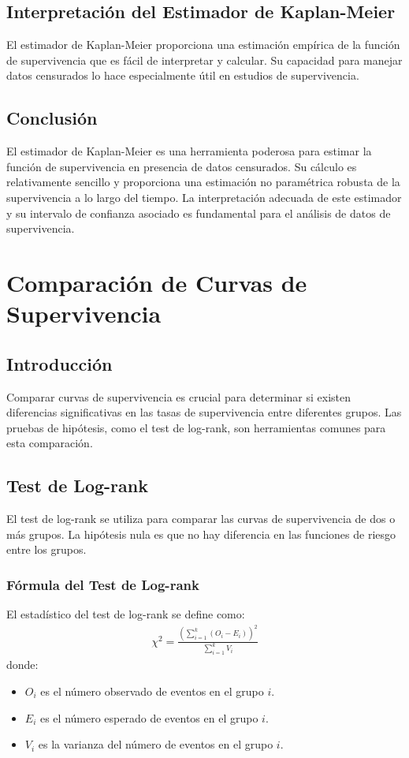 \documentclass[a4paper]{report} %
\begin{document}
\section{Interpretaci\'on del Estimador de Kaplan-Meier}
El estimador de Kaplan-Meier proporciona una estimaci\'on emp\'irica de la funci\'on de supervivencia que es f\'acil de interpretar y calcular. Su capacidad para manejar datos censurados lo hace especialmente \'util en estudios de supervivencia.

\section{Conclusi\'on}
El estimador de Kaplan-Meier es una herramienta poderosa para estimar la funci\'on de supervivencia en presencia de datos censurados. Su c\'alculo es relativamente sencillo y proporciona una estimaci\'on no param\'etrica robusta de la supervivencia a lo largo del tiempo. La interpretaci\'on adecuada de este estimador y su intervalo de confianza asociado es fundamental para el an\'alisis de datos de supervivencia.


\chapter{Comparaci\'on de Curvas de Supervivencia}
\section{Introducci\'on}
Comparar curvas de supervivencia es crucial para determinar si existen diferencias significativas en las tasas de supervivencia entre diferentes grupos. Las pruebas de hip\'otesis, como el test de log-rank, son herramientas comunes para esta comparaci\'on.

\section{Test de Log-rank}
El test de log-rank se utiliza para comparar las curvas de supervivencia de dos o m\'as grupos. La hip\'otesis nula es que no hay diferencia en las funciones de riesgo entre los grupos.

\subsection{F\'ormula del Test de Log-rank}
El estad\'istico del test de log-rank se define como:
\begin{eqnarray*}
\chi^2 = \frac{\left(\sum_{i=1}^k (O_i - E_i)\right)^2}{\sum_{i=1}^k V_i}
\end{eqnarray*}
donde:
\begin{itemize}
    \item $O_i$ es el n\'umero observado de eventos en el grupo $i$.
    \item $E_i$ es el n\'umero esperado de eventos en el grupo $i$.
    \item $V_i$ es la varianza del n\'umero de eventos en el grupo $i$.
\end{itemize}
\end{document}
